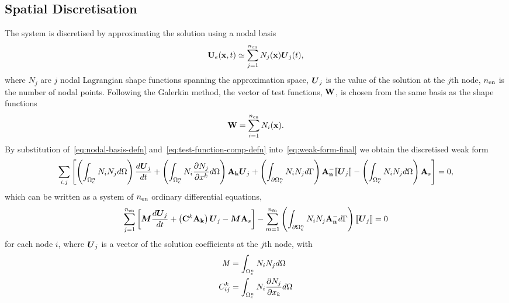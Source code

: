 \subsection{Spatial Discretisation}
The system is discretised by approximating the solution using a nodal basis
\begin{align}
\mathbf{U}_e(\mathbf{x},t) \simeq \sum_{j=1}^{n_\textrm{en}} N_{j} (\mathbf{x}) \boldsymbol{U}_{j}(t) ,
\label{eq:nodal-basis-defn}
\end{align}
where $N_{j}$ are $j$ nodal Lagrangian shape functions spanning the approximation space,
$\boldsymbol{U}_{j}$ is the value of the solution at the $j$th node, $n_\textrm{en}$ is the number of nodal
points. Following the Galerkin method, the
vector of test functions, $\mathbf{W}$, is chosen from the same basis as the shape
functions
\begin{align}
\mathbf{W} = \sum_{i=1}^{n_\textrm{en}} N_{i}(\mathbf{x}).
\label{eq:test-function-comp-defn}
\end{align}
By substitution of~\eqref{eq:nodal-basis-defn} and~\eqref{eq:test-function-comp-defn} into~\eqref{eq:weak-form-final} we obtain the discretised weak form
\begin{align*}
\sum_{i,j} \left[
  \left(
    \int_{\Omega_e^{n}} N_i N_j d\Omega
  \right)
  \frac{d \boldsymbol{U}_j}{d t}
+
  \left(
    \int_{\Omega_e^{n}} N_i \frac{\partial N_j}{\partial x^k} d\Omega
  \right)
  \mathbf{A}_\mathbf{k} \boldsymbol{U}_j
+
  \left(
  \int_{\partial \Omega_e^{n}} N_i N_j d\Gamma 
  \right)
  \mathbf{A}_\mathbf{n}^{-} \llbracket \boldsymbol{U}_{j} \rrbracket
-
  \left(
  \int_{\Omega_e^{n}} N_i N_j d\Omega
  \right)
  \mathbf{A}_s 
  \right]  = 0,
\end{align*}
which can be written as a system of $n_\textrm{en}$ ordinary differential equations,
$$
\sum_{j=1}^{n_\textrm{en}}
\left[
\boldsymbol{M} \frac{d \boldsymbol{U}_j}{d t} +
\left( \mathbf{C}^{k} \mathbf{A}_\mathbf{k} \right) \boldsymbol{U}_j -
\boldsymbol{M} \mathbf{A}_s
\right]
- \sum_{m=1}^{n_\textrm{fn}}
\left( 
\int_{\partial \Omega_e^{n}} N_i N_j \mathbf{A}_\mathbf{n}^{-} d\Gamma
 \right)
\llbracket \boldsymbol{U}_j \rrbracket
= 0
$$
for each node $i$, where $\boldsymbol{U}_j$ is a vector of the solution coefficients at
the $j$th node, with
\begin{align*}
\mathit{M} &= \int_{\Omega_e^{n}} N_i N_j d\Omega \\
C_{ij}^{k} &= \int_{\Omega_e^{n}} N_i \frac{\partial N_j}{\partial x_{k}}d\Omega
\end{align*}
